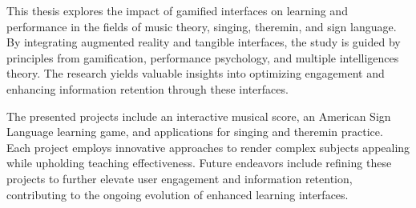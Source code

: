 This thesis explores the impact of gamified interfaces on learning and performance in the fields of music theory, singing, theremin, and sign language. By integrating augmented reality and tangible interfaces, the study is guided by principles from gamification, performance psychology, and multiple intelligences theory. The research yields valuable insights into optimizing engagement and enhancing information retention through these interfaces.

The presented projects include an interactive musical score, an American Sign Language learning game, and applications for singing and theremin practice. Each project employs innovative approaches to render complex subjects appealing while upholding teaching effectiveness. Future endeavors include refining these projects to further elevate user engagement and information retention, contributing to the ongoing evolution of enhanced learning interfaces.